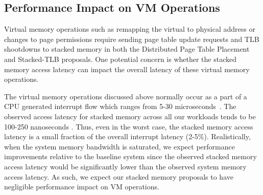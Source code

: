 \subsection{Performance Impact on VM Operations}

\noindent Virtual memory operations such as remapping the virtual to
physical address or changes to page permissions require sending page
table update requests and TLB shootdowns to stacked memory in both the
Distributed Page Table Placement and Stacked-TLB proposals. One
potential concern is whether the stacked memory access latency can
impact the overall latency of these virtual memory operations. 

The virtual memory operations discussed above normally occur as a part
of a CPU generated interrupt flow which ranges from 5-30
microseconds~\cite{zhengpagedgpu}. The observed access latency for
stacked memory across all our workloads tends to be 100-250
nanoseconds . Thus, even in the worst case, the stacked memory access
latency is a small fraction of the overall interrupt latency (2-5\%).
Realistically, when the system memory bandwidth is saturated, we
expect performance improvements relative to the baseline system since
the observed stacked memory access latency would be significantly
lower than the observed system memory access latency. As such, we
expect our stacked memory proposals to have negligible performance
impact on VM operations.


% 

